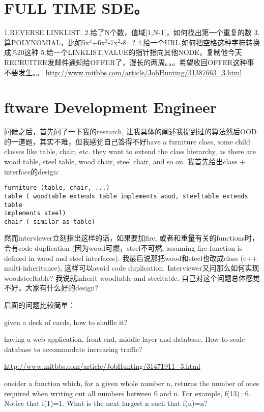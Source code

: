 \documentclass[12pt]{book}
\begin{document}
\chapter{FULL TIME SDE。}
\label{sec-31}
1.REVERSE LINKLIST.
2.给了N个数，值域[1,N-1]，如何找出第一个重复的数
3.算POLYNOMIAL，比如5x$^{\text{4}}$+6x$^{\text{3}}$-7x$^{\text{2}}$-8=?
4.给一个URL,如何把空格这种字符转换成\%20这种
5.给一个LINKLIST,VALUE的指针指向其他NODE，复制他今天RECRUITER发邮件通知给OFFER了，漫长的两周。。。希望收回OFFER这种事不要发生。。
\url{http://www.mitbbs.com/article/JobHunting/31387663_3.html}

\chapter{ftware Development Engineer}
\label{sec-32}
问候之后，首先问了一下我的research, 让我具体的阐述我提到过的算法然后OOD的一道题，其实不难，但我感觉自己答得不好have a furniture class, some child classes like table, chair, etc.
they want to extend the class hierarchy, as there are wood table, steel table, wood chair, steel chair, and so on.
我首先给出class + interface的design:
\lstset{language=java,label= ,caption= ,numbers=none}
\begin{lstlisting}
furniture (table, chair, ...)
table ( woodtable extends table implements wood, steeltable extends table 
implements steel)
chair ( similar as table)
\end{lstlisting}
然而interviewer立刻指出这样的话，如果要加fire, 或者和重量有关的functions时，会有code duplication (因为wood可燃，steel不可燃, assuming fire function is defined in wood and steel interfaces). 我最后说那把wood和steel也改成class (c++ multi-inheritance), 这样可以avoid code duplication. Interviewer又问那么如何实现woodsteeltable? 我说就inherit woodtable and steeltable. 自己对这个问题总体感觉不好。大家有什么好的design?

后面的问题比较简单：

given a deck of cards, how to shuffle it?

having a web application, front-end, middle layer and database. How to
scale database to accommodate increasing traffic?

\url{http://www.mitbbs.com/article/JobHunting/31471911_3.html}

onsider a function which, for a given whole number n, returns the
number of ones required when writing out all numbers between 0 and n. For example, f(13)=6. Notice that f(1)=1. What is the next largest n such that f(n)=n?
\end{document}
